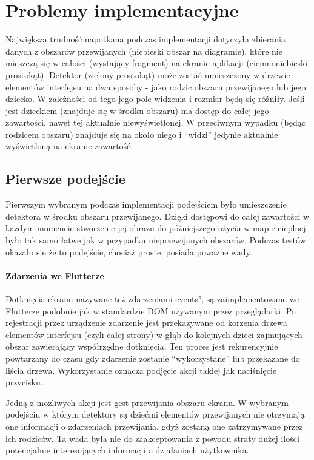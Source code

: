 \section{Problemy implementacyjne}
Największa trudność napotkana podczas implementacji dotyczyła zbierania danych z obszarów przewijanych (niebieski obszar na diagramie), które nie mieszczą się w całości (wystający fragment) na ekranie aplikacji (ciemnoniebieski prostokąt). Detektor (zielony prostokąt) może zostać umieszczony w drzewie elementów interfejsu na dwa sposoby - jako rodzic obszaru przewijanego lub jego dziecko. W zależności od tego jego pole widzenia i rozmiar będą się różniły. Jeśli jest dzieckiem (znajduje się w środku obszaru) ma dostęp do całej jego zawartości, nawet tej aktualnie niewyświetlonej. W przeciwnym wypadku (będąc rodzicem obszaru) znajduje się na około niego i ``widzi'' jedynie aktualnie wyświetloną na ekranie zawartość.


\subsection{Pierwsze podejście}
Pierwszym wybranym podczas implementacji podejściem było umieszczenie detektora w środku obszaru przewijanego. Dzięki dostępowi do całej zawartości w każdym momencie stworzenie jej obrazu do późniejszego użycia w mapie cieplnej było tak samo łatwe jak w przypadku nieprzewijanych obszarów. Podczas testów okazało się że to podejście, chociaż proste, posiada poważne wady.

\paragraph{Zdarzenia we Flutterze}
Dotknięcia ekranu nazywane też zdarzeniami \ang{events}, są zaimplementowane we Flutterze podobnie jak w standardzie DOM używanym przez przeglądarki. Po rejestracji przez urządzenie zdarzenie jest przekazywane od korzenia drzewa elementów interfejsu (czyli całej strony) w głąb do kolejnych dzieci zajmujących obszar zawierający współrzędne dotknięcia. Ten proces jest rekurencyjnie powtarzany do czasu gdy zdarzenie zostanie ``wykorzystane'' lub przekazane do liścia drzewa. Wykorzystanie oznacza podjęcie akcji takiej jak naciśnięcie przycisku.

Jedną z możliwych akcji jest gest przewijania obszaru ekranu. W wybranym podejściu w którym detektory są dziećmi elementów przewijanych nie otrzymają one informacji o zdarzeniach przewijania, gdyż zostaną one zatrzymywane przez ich rodziców. Ta wada była nie do zaakceptowania z powodu straty dużej ilości potencjalnie interesujących informacji o działaniach użytkownika.

